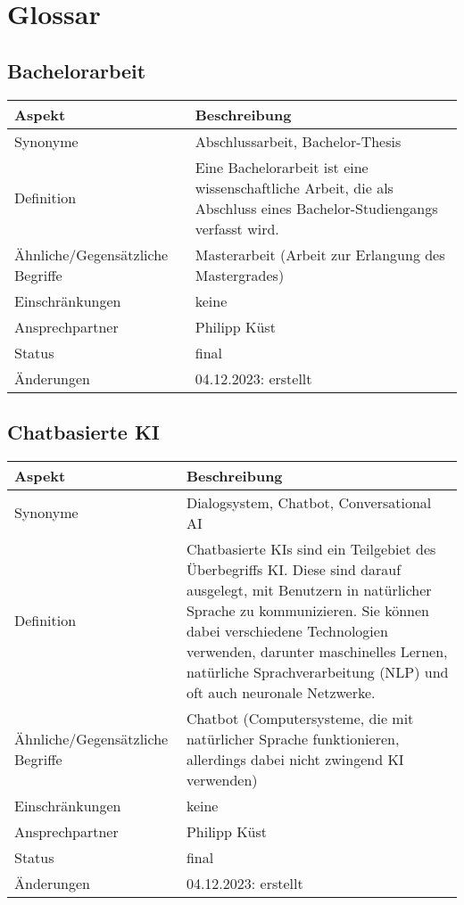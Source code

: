 \chapter{Glossar}\label{ch:glossar}
\section{Bachelorarbeit}\label{sec:glossar_bachelorarbeit}
\begin{tabularx}{\textwidth}{|l|X|}
    \hline
    \textbf{Aspekt} & \textbf{Beschreibung} \\
    \hline
    Synonyme & Abschlussarbeit, Bachelor-Thesis \\
    \hline
    Definition & Eine Bachelorarbeit ist eine wissenschaftliche Arbeit, die als Abschluss eines Bachelor-Studiengangs verfasst wird. \\
    \hline
    Ähnliche/Gegensätzliche Begriffe & Masterarbeit (Arbeit zur Erlangung des Mastergrades) \\
    \hline
    Einschränkungen & keine\\
    \hline
    Ansprechpartner & Philipp Küst \\
    \hline
    Status & final \\
    \hline
    Änderungen & 04.12.2023: erstellt \\
    \hline
\end{tabularx}

\section{Chatbasierte KI}\label{sec:glossar_chatbasierte_ki}
\begin{tabularx}{\textwidth}{|l|X|}
    \hline
    \textbf{Aspekt} & \textbf{Beschreibung} \\
    \hline
    Synonyme & Dialogsystem, Chatbot, Conversational AI \\
    \hline
    Definition & Chatbasierte KIs sind ein Teilgebiet des Überbegriffs KI.
    Diese sind darauf ausgelegt, mit Benutzern in natürlicher Sprache zu kommunizieren.
    Sie können dabei verschiedene Technologien verwenden, darunter maschinelles Lernen, natürliche Sprachverarbeitung (NLP) und oft auch neuronale Netzwerke. \\
    \hline
    Ähnliche/Gegensätzliche Begriffe & Chatbot (Computersysteme, die mit natürlicher Sprache funktionieren, allerdings dabei nicht zwingend KI verwenden) \\
    \hline
    Einschränkungen & keine \\
    \hline
    Ansprechpartner & Philipp Küst \\
    \hline
    Status & final \\
    \hline
    Änderungen & 04.12.2023: erstellt \\
    \hline
\end{tabularx}

